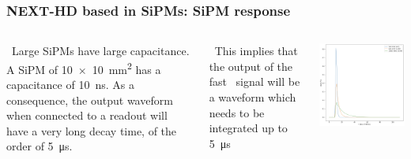 \begin{frame}
\frametitle{NEXT-HD based in SiPMs:  SiPM response}

\begin{columns}

\blt\ Large SiPMs have large capacitance. A SiPM of \SI{10 x 10}{mm^2} has a capacitance of \SI{10}{ns}. As a consequence, the output waveform when connected to a readout will have a very long decay time, of the order of \SI{5}{\micro\second}.

\blt\ This implies that the output of the fast \sone\ signal will be a waveform which needs to be integrated up to \SI{5}{\micro\second}

\includegraphics[scale=0.23]{img/sipmResponse.png}

\end{columns}
\end{frame}

